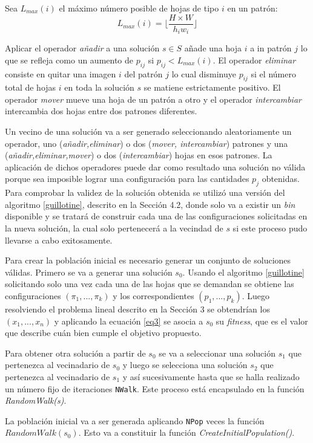 \documentclass[a4paper,10pt,twocolumn]{article}
\begin{document}
Sea $L_{max}(i)$ el máximo número posible de hojas de tipo $i$ en un patrón:
$$ L_{max}(i) = \lfloor \frac{H \times W}{h_iw_i} \rfloor$$

Aplicar el operador \textit{añadir} a una solución $s \in S$ añade una hoja $i$ a in patrón $j$ lo que se refleja como un aumento de $p_{ij}$ si $p_{ij} < L_{max}(i)$. El operador \textit{eliminar} consiste en quitar una imagen $i$ del patrón $j$ lo cual disminuye $p_{ij}$ si el número total de hojas $i$ en toda la solución $s$ se matiene estrictamente positivo. El operador \textit{mover} mueve una hoja de un patrón a otro y el operador \textit{intercambiar} intercambia dos hojas entre dos patrones diferentes. 

Un vecino de una solución va a ser generado seleccionando aleatoriamente un operador, uno (\textit{añadir,eliminar}) o dos (\textit{mover, intercambiar}) patrones y una (\textit{añadir,eliminar,mover}) o dos (\textit{intercambiar}) hojas en esos patrones. La aplicación de dichos operadores puede dar como resultado una solución no válida porque sea imposible lograr una configuración para las cantidades $p_j$ obtenidas. Para comprobar la validez de la solución obtenida se utilizó una versión del algoritmo \ref{guillotine}, descrito en la Sección 4.2, donde solo va a existir un \textit{bin} disponible y se tratará de construir cada una de las configuraciones solicitadas en la nueva solución, la cual solo pertenecerá a la vecindad de $s$ si este proceso pudo llevarse a cabo exitosamente.      

Para crear la población inicial es necesario generar un conjunto de soluciones válidas. Primero se va a generar una solución $s_0$. Usando el algoritmo \ref{guillotine} solicitando solo una vez cada una de las hojas que se demandan se obtiene las configuraciones $(\pi_1,...,\pi_k)$ y los correspondientes $(p_1,...,p_k)$. Luego resolviendo el problema lineal descrito en la Sección 3 se obtendrían los $(x_1,...,x_n)$ y aplicando la ecuación \ref{eq3} se asocia a $s_0$ su \textit{fitness}, que es el valor que describe cuán bien cumple el objetivo propuesto. 

Para obtener otra solución a partir de $s_0$ se va a seleccionar una solución $s_1$ que pertenezca al vecinadario de $s_0$ y luego se selecciona una solución $s_2$ que pertenezca al vecinadario de $s_1$ y así sucesivamente hasta que se halla realizado un
número fijo de iteraciones \texttt{NWalk}. Este proceso está encapsulado en la función \textit{RandomWalk(s)}. 

La población inicial va a ser generada aplicando \texttt{NPop} veces la función $RandomWalk(s_0)$. Esto va a constituir la función \textit{CreateInitialPopulation()}.     
\end{document}
